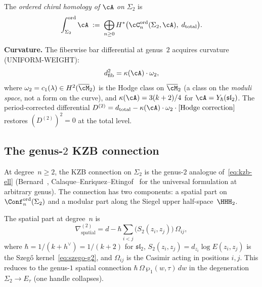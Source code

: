 \begin{definition}
\label{def:ord-ch-g2}
The \emph{ordered chiral homology of $\cA$ on $\Sigma_2$} is
\begin{equation}\label{eq:ord-ch-g2}
  \int_{\Sigma_2}^{\mathrm{ord}} \cA
  \;:=\;
  \bigoplus_{n \geq 0}
  H^*\bigl(
  \cC_n^{\mathrm{ord}}(\Sigma_2, \cA),\;
  d_{\mathrm{total}}\bigr).
\end{equation}
\end{definition}

\noindent
\textbf{Curvature.}
The fiberwise bar differential at genus~$2$ acquires
curvature (UNIFORM-WEIGHT):
\begin{equation}\label{eq:fib-curvature-g2}
  d_{\mathrm{fib}}^2 = \kappa(\cA) \cdot \omega_2,
\end{equation}
where $\omega_2 = c_1(\lambda) \in H^2(\overline{\cM}_2)$
is the Hodge class on $\overline{\cM}_2$
(a class on the \emph{moduli space}, not a form on the
curve), and $\kappa(\cA) = 3(k+2)/4$ for
$\cA = Y_\hbar(\mathfrak{sl}_2)$. The period-corrected
differential
$D^{(2)} = d_{\mathrm{total}} - \kappa(\cA) \cdot
\omega_2 \cdot [\text{Hodge correction}]$ restores
$(D^{(2)})^2 = 0$ at the total level.

\subsection{The genus-$2$ KZB connection}
\label{subsec:g2-kzb}

At degree~$n \geq 2$, the KZB connection on $\Sigma_2$
is the genus-$2$ analogue of~\eqref{eq:kzb-ell}
(Bernard~\cite{Bernard88},
Calaque--Enriquez--Etingof~\cite{CEE09} for the
universal formulation at arbitrary genus).
The connection has two components: a spatial part on
$\Conf_n^{\mathrm{ord}}(\Sigma_2)$ and a modular part
along the Siegel upper half-space~$\HHH_2$.

The spatial part at degree~$n$ is
\begin{equation}\label{eq:kzb-g2-spatial}
  \nabla^{(2)}_{\mathrm{spatial}}
  = d
  - \hbar \sum_{i < j}
  \bigl(S_2(z_i, z_j)\bigr)\,\Omega_{ij},
\end{equation}
where $\hbar = 1/(k + h^\vee) = 1/(k+2)$ for
$\mathfrak{sl}_2$, $S_2(z_i, z_j) = d_{z_i}\log E(z_i, z_j)$
is the Szeg\H{o} kernel~\eqref{eq:szego-g2},
and $\Omega_{ij}$ is the Casimir acting in positions
$i, j$. This reduces to the genus-$1$ spatial connection
$\hbar\,\Omega\,\wp_1(w, \tau)\,dw$ in the degeneration
$\Sigma_2 \to E_\tau$ (one handle collapses).

